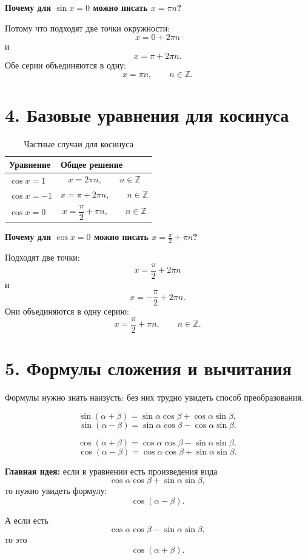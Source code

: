 \documentclass[a4paper,12pt]{article}
\newcommand{\topic}[1]{\textcolor{darkaccent}{\textbf{#1}}}
\newcommand{\Z}{\mathbb{Z}}
\begin{document}
\topic{Почему для \(\sin x=0\) можно писать \(x=\pi n\)?}

Потому что подходят две точки окружности:
\[
    x=0+2\pi n
\]
и
\[
    x=\pi+2\pi n.
\]
Обе серии объединяются в одну:
\[
    x=\pi n,\qquad n\in\Z.
\]

\section*{4. Базовые уравнения для косинуса}

\begin{table}[h!]
\caption{Частные случаи для косинуса}
\centering
\begin{tabularx}{\linewidth}{@{}lX@{}}
\toprule
\textbf{Уравнение} & \textbf{Общее решение} \\
\midrule
\(\cos x=1\) &
\[
    x=2\pi n,\qquad n\in\Z
\]
\\
\(\cos x=-1\) &
\[
    x=\pi+2\pi n,\qquad n\in\Z
\]
\\
\(\cos x=0\) &
\[
    x=\frac{\pi}{2}+\pi n,\qquad n\in\Z
\]
\\
\bottomrule
\end{tabularx}
\end{table}

\topic{Почему для \(\cos x=0\) можно писать \(x=\frac{\pi}{2}+\pi n\)?}

Подходят две точки:
\[
    x=\frac{\pi}{2}+2\pi n
\]
и
\[
    x=-\frac{\pi}{2}+2\pi n.
\]
Они объединяются в одну серию:
\[
    x=\frac{\pi}{2}+\pi n,\qquad n\in\Z.
\]

\section*{5. Формулы сложения и вычитания}

Формулы нужно знать наизусть: без них трудно увидеть способ преобразования.

\[
    \sin(\alpha+\beta)=\sin\alpha\cos\beta+\cos\alpha\sin\beta,
\]
\[
    \sin(\alpha-\beta)=\sin\alpha\cos\beta-\cos\alpha\sin\beta.
\]

\[
    \cos(\alpha+\beta)=\cos\alpha\cos\beta-\sin\alpha\sin\beta,
\]
\[
    \cos(\alpha-\beta)=\cos\alpha\cos\beta+\sin\alpha\sin\beta.
\]

\topic{Главная идея:} если в уравнении есть произведения вида
\[
    \cos\alpha\cos\beta+\sin\alpha\sin\beta,
\]
то нужно увидеть формулу:
\[
    \cos(\alpha-\beta).
\]

А если есть
\[
    \cos\alpha\cos\beta-\sin\alpha\sin\beta,
\]
то это
\[
    \cos(\alpha+\beta).
\]
\end{document}
